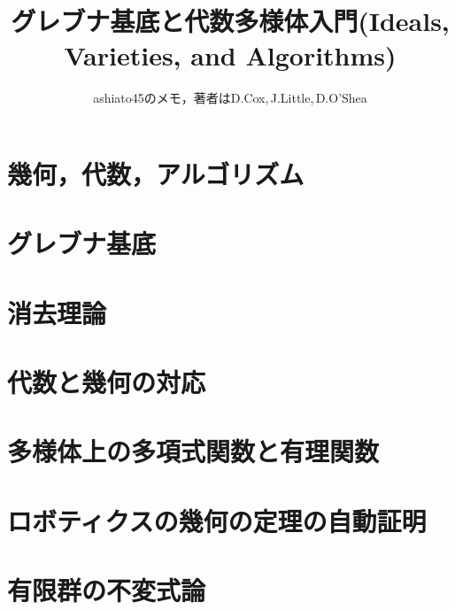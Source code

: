 \documentclass[9pt]{ltjsarticle}
\title{グレブナ基底と代数多様体入門(Ideals, Varieties, and Algorithms)}
\author{ashiato45のメモ，著者はD.Cox,\,J.Little,\,D.O'Shea}
\begin{document}
\maketitle


\section{幾何，代数，アルゴリズム}
%


\section{グレブナ基底}
% 


\section{消去理論}
%

\section{代数と幾何の対応}
%

\section{多様体上の多項式関数と有理関数}
%

\section{ロボティクスの幾何の定理の自動証明}
\label{sec:ロボティクスの幾何の定理の自動証明}

\section{有限群の不変式論}

\end{document}
